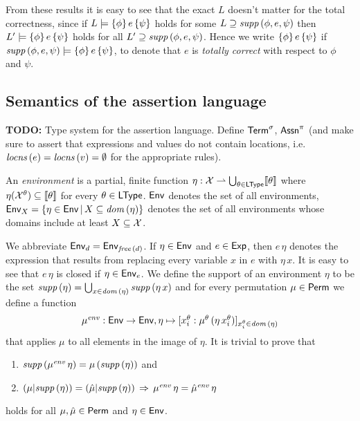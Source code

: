 \documentclass[12pt,a4paper]{report}
\newcommand{\senv}{\nstyle{env}}
\begin{document}
From these results it is easy to see that the exact $L$ doesn't matter for the total correctness, since
if $L\models\{\phi\}\,e\,\{\psi\}$ holds for some $L \supseteq \mathit{supp}\,(\phi,e,\psi)$
then $L'\models\{\phi\}\,e\,\{\psi\}$ holds for all $L'\supseteq \mathit{supp}\,(\phi,e,\psi)$.
Hence we write $\{\phi\}\,e\,\{\psi\}$ if $\mathit{supp}\,(\phi,e,\psi)\models\{\phi\}\,e\,\{\psi\}$,
to denote that $e$ is {\em totally correct} with respect to $\phi$ and $\psi$. 



\subsection{Semantics of the assertion language}

{\bf TODO:} Type system for the assertion language. Define $\mathsf{Term}^\sigma$, $\mathsf{Assn}^\pi$ (and make sure
to assert that expressions and values do not contain locations, i.e. $\mathit{locns}\,(e) = \mathit{locns}\,(v) = \emptyset$
for the appropriate rules).

\begin{definition}[Environment] \label{definition:Environment}
  An {\em environment} is a partial, finite function $\eta: \mathcal{X} \rightharpoonup \bigcup_{\theta\in\mathsf{LType}} \llbracket\theta\rrbracket$
  where $\eta(\mathcal{X}^\theta) \subseteq \llbracket\theta\rrbracket$ for every $\theta \in \mathsf{LType}$. $\mathsf{Env}$ denotes
  the set of all environments, $\mathsf{Env}_X = \{\eta\in\mathsf{Env}\,|\,X \subseteq \mathit{dom}\,(\eta)\}$ denotes the set of
  all environments whose domains include at least $X \subseteq \mathcal{X}$.
\end{definition}

We abbreviate $\mathsf{Env}_d = \mathsf{Env}_{\mathit{free}\,(d)}$. If $\eta \in \mathsf{Env}$ and $e \in \mathsf{Exp}$, then $e\,\eta$ denotes
the expression that results from replacing every variable $x$ in $e$ with $\eta\,x$. It is
easy to see that $e\,\eta$ is closed if $\eta \in \mathsf{Env}_e$. We define the support of an environment $\eta$
to be the set $\mathit{supp}\,(\eta) = \bigcup_{x\in\mathit{dom}\,(\eta)} \mathit{supp}\,(\eta\,x)$ and for every permutation
$\mu\in\mathsf{Perm}$ we define a function
\[\begin{array}{c}
  \mu^\senv: \Env \to \Env, \eta \mapsto [x^\theta_i: \mu^\theta\,(\eta\,x^\theta_i)]_{x^\theta_i\in\dom{\eta}}
\end{array}\]
that applies $\mu$ to all elements in the image of $\eta$. It is trivial to prove that
\begin{enumerate}
  \item $\supp{\mu^\senv\,\eta} = \mu\,(\supp{\eta})$ and
  \item $(\mu|\supp{\eta}) = (\hat{\mu}|\supp{\eta}) \,\Rightarrow\, \mu^\senv\,\eta = \hat{\mu}^\senv\,\eta$
\end{enumerate}
holds for all $\mu,\hat{\mu}\in\mathsf{Perm}$ and $\eta\in\mathsf{Env}$.
\end{document}
